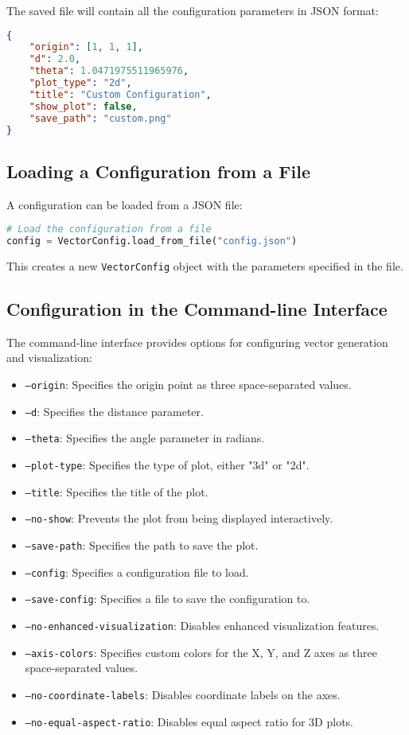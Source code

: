 The saved file will contain all the configuration parameters in JSON format:

\begin{lstlisting}[language=JSON]
{
    "origin": [1, 1, 1],
    "d": 2.0,
    "theta": 1.0471975511965976,
    "plot_type": "2d",
    "title": "Custom Configuration",
    "show_plot": false,
    "save_path": "custom.png"
}
\end{lstlisting}

\subsection{Loading a Configuration from a File}

A configuration can be loaded from a JSON file:

\begin{lstlisting}[language=Python]
# Load the configuration from a file
config = VectorConfig.load_from_file("config.json")
\end{lstlisting}

This creates a new \texttt{VectorConfig} object with the parameters specified in the file.

\subsection{Configuration in the Command-line Interface}

The command-line interface provides options for configuring vector generation and visualization:

\begin{itemize}
    \item \texttt{--origin}: Specifies the origin point as three space-separated values.
    \item \texttt{--d}: Specifies the distance parameter.
    \item \texttt{--theta}: Specifies the angle parameter in radians.
    \item \texttt{--plot-type}: Specifies the type of plot, either "3d" or "2d".
    \item \texttt{--title}: Specifies the title of the plot.
    \item \texttt{--no-show}: Prevents the plot from being displayed interactively.
    \item \texttt{--save-path}: Specifies the path to save the plot.
    \item \texttt{--config}: Specifies a configuration file to load.
    \item \texttt{--save-config}: Specifies a file to save the configuration to.
    \item \texttt{--no-enhanced-visualization}: Disables enhanced visualization features.
    \item \texttt{--axis-colors}: Specifies custom colors for the X, Y, and Z axes as three space-separated values.
    \item \texttt{--no-coordinate-labels}: Disables coordinate labels on the axes.
    \item \texttt{--no-equal-aspect-ratio}: Disables equal aspect ratio for 3D plots.
\end{itemize}

